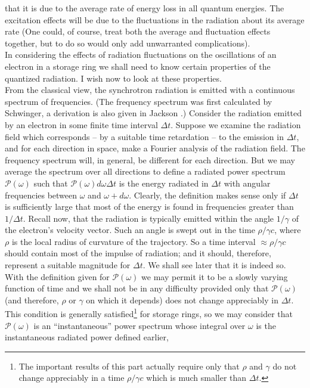  that it is due to the average rate of energy loss in all quantum energies. The excitation
 effects will be due to the fluctuations in the radiation about its average rate (One could, of
course, treat both the average and fluctuation effects together, but to do so would only add unwarranted complications).\\
In considering the effects of radiation fluctuations on the oscillations of an electron in a storage ring we shall need to know certain properties of the quantized radiation. I wish now to look at these properties.\\
From the classical view, the synchrotron radiation is emitted with a continuous spectrum of frequencies. (The frequency spectrum was first calculated by \cite{13} Schwinger, a derivation
 is also given in Jackson \cite{10}.) Consider the radiation emitted by an electron in some finite time interval $\Delta t$. Suppose we examine the radiation field which corresponds
 -- by a suitable time retardation -- to the emission in $\Delta t$, and for each direction in space, make a Fourier analysis of the radiation field. The frequency spectrum will, in general,
 be different for each direction. But we may average the spectrum over all directions to define a radiated power spectrum $\mathscr{P}(\omega)$ such that $\mathscr{P}(\omega)d\omega \Delta t$ is the energy radiated in $\Delta t$ with angular frequencies between $\omega$ and $\omega + d\omega$. Clearly, the definition makes sense only if $\Delta t$ is sufficiently large that most of the energy is found in frequencies greater than $1/\Delta t$. Recall now, that the radiation
 is typically emitted within the angle $1/\gamma$ of the electron's velocity vector. Such an angle is swept out in the time $\rho/\gamma c$, where $\rho$ is the local radius of curvature
 of the trajectory. So a time interval $\approx \rho/\gamma c$ should contain most of the impulse of radiation; and it should, therefore, represent a suitable magnitude for $\Delta t$. We shall see later that it is indeed so.\\
With the definition given for $\mathscr{P}(\omega)$ we may permit it to be a slowly varying
function of time and we shall not be in any difficulty provided only that $\mathscr{P}(\omega)$
 (and therefore, $\rho$ or $\gamma$ on which it depends) does not change appreciably in $\Delta t$. This condition is generally satisfied\footnote{The important results of this part actually require only that $\rho$ and $\gamma$ do not change appreciably in a time $\rho/\gamma c$ which is much smaller than $\Delta t$.} for storage rings, so we may consider that $\mathscr{P}(\omega)$ is an ``instantaneous'' power spectrum whose integral over $\omega$ is the instantaneous radiated power defined earlier,
